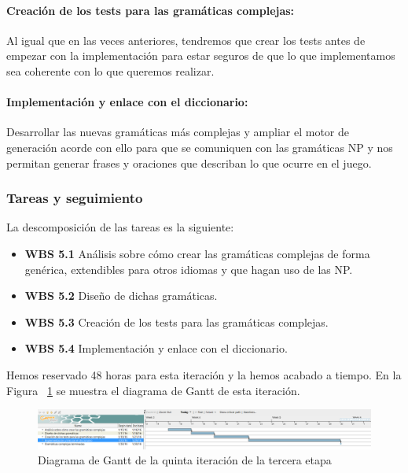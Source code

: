 \paragraph{Creación de los tests para las gramáticas complejas:} Al igual que en las veces anteriores, tendremos que crear los tests antes de empezar con la implementación para estar seguros de que lo que implementamos sea coherente con lo que queremos realizar.

\paragraph{Implementación y enlace con el diccionario:} Desarrollar las nuevas gramáticas más complejas y ampliar el motor de generación acorde con ello para que se comuniquen con las gramáticas NP y nos permitan generar frases y oraciones que describan lo que ocurre en el juego.

\subsubsection{Tareas y seguimiento}

La descomposición de las tareas es la siguiente:

\begin{itemize}
  \item \textbf{WBS 5.1} Análisis sobre cómo crear las gramáticas complejas de forma genérica, extendibles para otros idiomas y que hagan uso de las NP.
  \item \textbf{WBS 5.2} Diseño de dichas gramáticas.
  \item \textbf{WBS 5.3} Creación de los tests para las gramáticas complejas.
  \item \textbf{WBS 5.4} Implementación y enlace con el diccionario.
\end{itemize}

\noindent Hemos reservado 48 horas para esta iteración y la hemos acabado a tiempo. En la Figura ~\ref{fig:sec3it5} se muestra el diagrama de Gantt de esta iteración.

\begin{figure}
    \includegraphics[width=\textwidth,height=\textheight,keepaspectratio]{./img/sec3it5.png}
  \caption{Diagrama de Gantt de la quinta iteración de la tercera etapa}
  \label{fig:sec3it5}
\end{figure}


